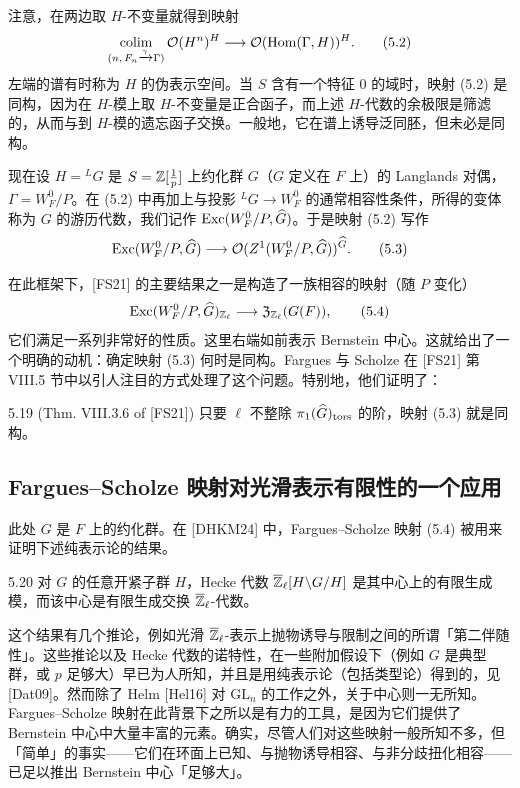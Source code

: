注意，在两边取 $H$-不变量就得到映射
\begin{equation}
\operatorname*{colim}_{(n,\,F_n\xrightarrow{\gamma}\Gamma)}\mathcal O(H^n)^H\longrightarrow\mathcal O(\operatorname{Hom}(\Gamma,H))^H.
\tag{5.2}
\end{equation}
左端的谱有时称为 $H$ 的伪表示空间。当 $S$ 含有一个特征 $0$ 的域时，映射 (5.2) 是同构，因为在 $H$-模上取 $H$-不变量是正合函子，而上述 $H$-代数的余极限是筛滤的，从而与到 $H$-模的遗忘函子交换。一般地，它在谱上诱导泛同胚，但未必是同构。

现在设 $H={}^LG$ 是 $S=\mathbb{Z}[\frac1p]$ 上约化群 $G$（$G$ 定义在 $F$ 上）的 Langlands 对偶，$\Gamma=W_F^0/P$。在 (5.2) 中再加上与投影 ${}^LG\to W_F^0$ 的通常相容性条件，所得的变体称为 $G$ 的游历代数，我们记作 $\mathrm{Exc}(W_F^0/P,\widehat{G})$。于是映射 (5.2) 写作
\begin{equation}
\mathrm{Exc}(W_F^0/P,\widehat{G})\longrightarrow\mathcal O(Z^1(W_F^0/P,\widehat{G}))^{\widehat{G}}.
\tag{5.3}
\end{equation}

在此框架下，[FS21] 的主要结果之一是构造了一族相容的映射（随 $P$ 变化）
\begin{equation}
\mathrm{Exc}(W_F^0/P,\widehat{G})_{\mathbb{Z}_\ell}\longrightarrow\mathfrak Z_{\mathbb{Z}_\ell}(G(F)),
\tag{5.4}
\end{equation}
它们满足一系列非常好的性质。这里右端如前表示 Bernstein 中心。这就给出了一个明确的动机：确定映射 (5.3) 何时是同构。Fargues 与 Scholze 在 [FS21] 第 VIII.5 节中以引人注目的方式处理了这个问题。特别地，他们证明了：

\begin{thm}{5.19 (Thm. VIII.3.6 of [FS21])}
只要 $\ell$ 不整除 $\pi_1(\widehat{G})_{\mathrm{tors}}$ 的阶，映射 (5.3) 就是同构。
\end{thm}

\subsection{Fargues--Scholze 映射对光滑表示有限性的一个应用}
此处 $G$ 是 $F$ 上的约化群。在 [DHKM24] 中，Fargues--Scholze 映射 (5.4) 被用来证明下述纯表示论的结果。

\begin{thm}{5.20}
对 $G$ 的任意开紧子群 $H$，Hecke 代数 $\overline{\mathbb{Z}}_\ell[H\backslash G/H]$ 是其中心上的有限生成模，而该中心是有限生成交换 $\overline{\mathbb{Z}}_\ell$-代数。
\end{thm}

这个结果有几个推论，例如光滑 $\overline{\mathbb{Z}}_\ell$-表示上抛物诱导与限制之间的所谓「第二伴随性」。这些推论以及 Hecke 代数的诺特性，在一些附加假设下（例如 $G$ 是典型群，或 $p$ 足够大）早已为人所知，并且是用纯表示论（包括类型论）得到的，见 [Dat09]。然而除了 Helm [Hel16] 对 $\mathrm{GL}_n$ 的工作之外，关于中心则一无所知。Fargues--Scholze 映射在此背景下之所以是有力的工具，是因为它们提供了 Bernstein 中心中大量丰富的元素。确实，尽管人们对这些映射一般所知不多，但「简单」的事实——它们在环面上已知、与抛物诱导相容、与非分歧扭化相容——已足以推出 Bernstein 中心「足够大」。

